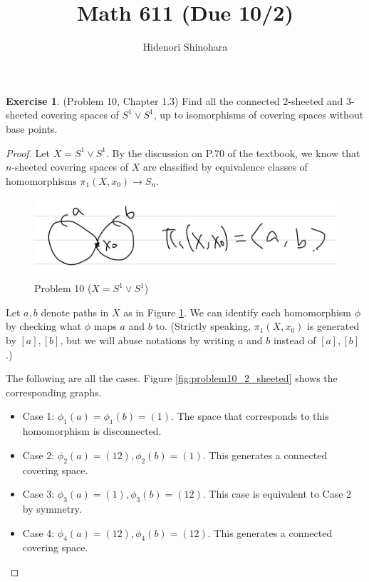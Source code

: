 \documentclass[12pt, psamsfonts]{amsart}
\theoremstyle{definition}
\newtheorem*{exer}{Exercise}
\theoremstyle{remark}
\numberwithin{equation}{section}
\begin{document}
\title{Math 611 (Due 10/2)}
\author{Hidenori Shinohara}
\maketitle

\begin{exer}{(Problem 10, Chapter 1.3)}
  Find all the connected 2-sheeted and 3-sheeted covering spaces of $S^1 \vee S^1$, up to isomorphisms of covering spaces without base points.
\end{exer}

\begin{proof}
  Let $X = S^1 \vee S^1$.
  By the discussion on P.70 of the textbook, we know that $n$-sheeted covering spaces of $X$ are classified by equivalence classes of homomorphisms $\pi_1(X, x_0) \rightarrow S_n$.
  \begin{figure}
    \includegraphics[width=.5\linewidth]{problem10_s1.jpeg}
    \caption{Problem 10 ($X = S^1 \vee S^1$)}
    \label{fig:problem10}
  \end{figure}
  Let $a, b$ denote paths in $X$ as in Figure \ref{fig:problem10}.
  We can identify each homomorphism $\phi$ by checking what $\phi$ maps $a$ and $b$ to.
  (Strictly speaking, $\pi_1(X, x_0)$ is generated by $[a], [b]$, but we will abuse notations by writing $a$ and $b$ instead of $[a], [b]$.)


  The following are all the cases.
  Figure \ref{fig:problem10_2_sheeted} shows the corresponding graphs.
  \begin{itemize}
    \item
      Case 1: $\phi_1(a) = \phi_1(b) = (1)$.
      The space that corresponds to this homomorphism is disconnected.
    \item
      Case 2: $\phi_2(a) = (12), \phi_2(b) = (1)$.
      This generates a connected covering space.
    \item
      Case 3: $\phi_3(a) = (1), \phi_3(b) = (12)$.
      This case is equivalent to Case 2 by symmetry.
    \item
      Case 4: $\phi_4(a) = (12), \phi_4(b) = (12)$.
      This generates a connected covering space.
  \end{itemize}


\end{proof}
\end{document}

